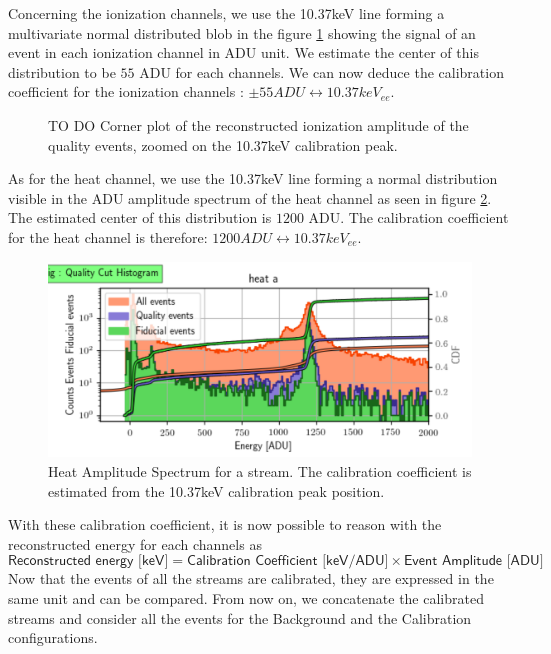 Concerning the ionization channels, we use the 10.37keV line forming a multivariate normal distributed blob in the figure \ref{fig:calibration-ion} showing the signal of an event in each ionization channel in ADU unit. We estimate the center of this distribution to be $55$ ADU for each channels. We can now deduce the calibration coefficient for the ionization channels : $\pm 55 ADU \leftrightarrow 10.37 keV_{ee}$.

\begin{figure}
\centering
\caption{TO DO Corner plot of the reconstructed ionization amplitude of the quality events, zoomed on the 10.37keV calibration peak.}
\label{fig:calibration-ion}
\end{figure}

As for the heat channel, we use the 10.37keV line forming a normal distribution visible in the ADU amplitude spectrum of the heat channel as seen in figure \ref{fig:calibration-heat}. The estimated center of this distribution is $1200$ ADU. The calibration coefficient for the heat channel is therefore: $1200 ADU \leftrightarrow 10.37 keV_{ee}$.

\begin{figure}
\centering
\includegraphics[width=\linewidth,]{Figures/Neutron/calibration_heat.png}
\caption{Heat Amplitude Spectrum for a stream. The calibration coefficient is estimated from the 10.37keV calibration peak position.}
\label{fig:calibration-heat}
\end{figure}

With these calibration coefficient, it is now possible to reason with the reconstructed energy for each channels as
$$
\textsf{Reconstructed energy [keV]}
=
\textsf{Calibration Coefficient [keV/ADU]}
\times
\textsf{Event Amplitude [ADU]}
$$
Now that the events of all the streams are calibrated, they are expressed in the same unit and can be compared. From now on, we concatenate the calibrated streams and consider all the events for the Background and the Calibration configurations.


